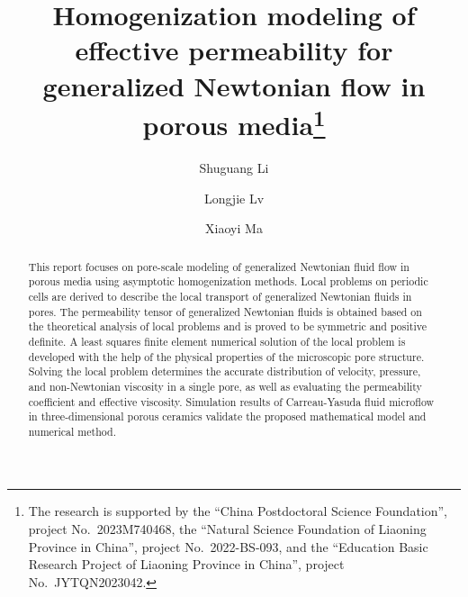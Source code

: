 \documentclass[12pt]{llncs}
\begin{document}
\fi
%
\title{Homogenization modeling of effective permeability for generalized Newtonian flow in porous 
media\thanks{The research is supported by the ``China Postdoctoral Science Foundation'', project No.~2023M740468,
the ``Natural Science Foundation of Liaoning Province in China'', project No.~2022-BS-093, and
the ``Education Basic Research Project of Liaoning Province in China'', project No.~JYTQN2023042.}}
\author{Shuguang Li \and Longjie Lv \and Xiaoyi Ma
}

\maketitle

\begin{abstract}
This report focuses on pore-scale modeling of generalized Newtonian fluid flow in porous media using asymptotic homogenization methods.
Local problems on periodic cells are derived to describe the local transport of generalized Newtonian fluids in pores.
The permeability tensor of generalized Newtonian fluids is obtained based on the theoretical analysis of local problems and is proved to be symmetric and positive definite.
A least squares finite element numerical solution of the local problem is developed with the help of the physical properties of the microscopic pore structure.
Solving the local problem determines the accurate distribution of velocity, pressure, and non-Newtonian viscosity in a single pore, as well as evaluating the permeability coefficient and effective viscosity.
Simulation results of Carreau-Yasuda fluid microflow in three-dimensional porous ceramics validate the proposed mathematical model and numerical method.

\end{abstract}

\end{document}
